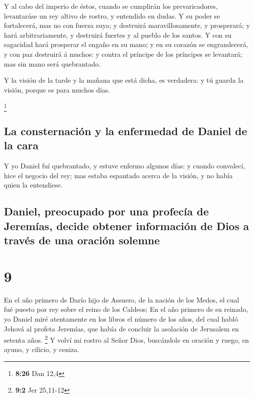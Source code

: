  Y al cabo del imperio de éstos, cuando se cumplirán los
prevaricadores, levantaráse un rey altivo de rostro, y entendido en
dudas.  Y su poder se fortalecerá, mas no con fuerza
suya; y destruirá maravillosamente, y prosperará; y hará
arbitrariamente, y destruirá fuertes y al pueblo de los santos.
 Y con su sagacidad hará prosperar el engaño en su mano;
y en su corazón se engrandecerá, y con paz destruirá á muchos: y contra
el príncipe de los príncipes se levantará; mas sin mano será
quebrantado.

 Y la visión de la tarde y la mañana que está dicha, es
verdadera: y tú guarda la visión, porque es para muchos días.

\footnote{\textbf{8:26} Dan 12,4}

\hypertarget{la-consternaciuxf3n-y-la-enfermedad-de-daniel-de-la-cara}{%
\subsection{La consternación y la enfermedad de Daniel de la
cara}\label{la-consternaciuxf3n-y-la-enfermedad-de-daniel-de-la-cara}}

 Y yo Daniel fuí quebrantado, y estuve enfermo algunos
días: y cuando convalecí, hice el negocio del rey; mas estaba espantado
acerca de la visión, y no había quien la entendiese.

\hypertarget{daniel-preocupado-por-una-profecuxeda-de-jeremuxedas-decide-obtener-informaciuxf3n-de-dios-a-travuxe9s-de-una-oraciuxf3n-solemne}{%
\subsection{Daniel, preocupado por una profecía de Jeremías, decide
obtener información de Dios a través de una oración
solemne}\label{daniel-preocupado-por-una-profecuxeda-de-jeremuxedas-decide-obtener-informaciuxf3n-de-dios-a-travuxe9s-de-una-oraciuxf3n-solemne}}

\hypertarget{section-8}{%
\section{9}\label{section-8}}

 En el año primero de Darío hijo de Assuero, de la nación
de los Medos, el cual fué puesto por rey sobre el reino de los Caldeos;
 En el año primero de su reinado, yo Daniel miré
atentamente en los libros el número de los años, del cual habló Jehová
al profeta Jeremías, que había de concluir la asolación de Jerusalem en
setenta años. \footnote{\textbf{9:2} Jer 25,11-12}  Y
volví mi rostro al Señor Dios, buscándole en oración y ruego, en ayuno,
y cilicio, y ceniza.

